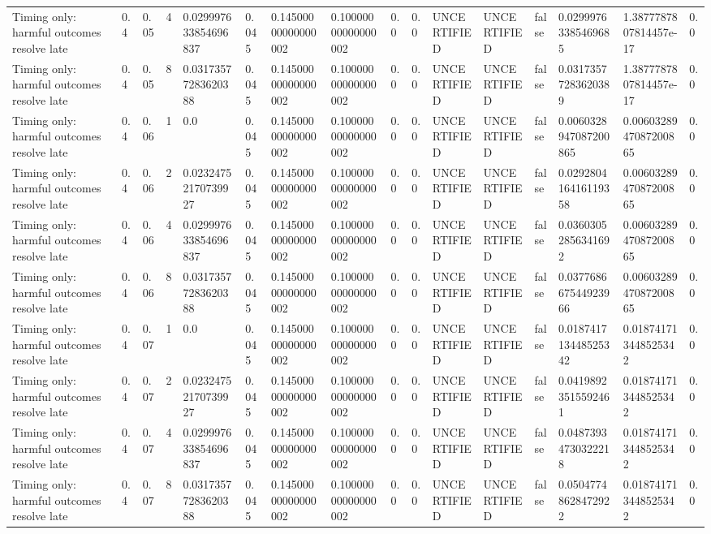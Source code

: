 \begin{tabular}{llllllllllllllll}
Timing only: harmful outcomes resolve late & 0.4 & 0.05 & 4 & 0.029997633854696837 & 0.045 & 0.14500000000000002 & 0.10000000000000002 & 0.0 & 0.0 & UNCERTIFIED & UNCERTIFIED & false & 0.02999763385469685 & 1.3877787807814457e-17 & 0.0 \\
Timing only: harmful outcomes resolve late & 0.4 & 0.05 & 8 & 0.03173577283620388 & 0.045 & 0.14500000000000002 & 0.10000000000000002 & 0.0 & 0.0 & UNCERTIFIED & UNCERTIFIED & false & 0.03173577283620389 & 1.3877787807814457e-17 & 0.0 \\
Timing only: harmful outcomes resolve late & 0.4 & 0.06 & 1 & 0.0 & 0.045 & 0.14500000000000002 & 0.10000000000000002 & 0.0 & 0.0 & UNCERTIFIED & UNCERTIFIED & false & 0.0060328947087200865 & 0.0060328947087200865 & 0.0 \\
Timing only: harmful outcomes resolve late & 0.4 & 0.06 & 2 & 0.02324752170739927 & 0.045 & 0.14500000000000002 & 0.10000000000000002 & 0.0 & 0.0 & UNCERTIFIED & UNCERTIFIED & false & 0.029280416416119358 & 0.0060328947087200865 & 0.0 \\
Timing only: harmful outcomes resolve late & 0.4 & 0.06 & 4 & 0.029997633854696837 & 0.045 & 0.14500000000000002 & 0.10000000000000002 & 0.0 & 0.0 & UNCERTIFIED & UNCERTIFIED & false & 0.03603052856341692 & 0.0060328947087200865 & 0.0 \\
Timing only: harmful outcomes resolve late & 0.4 & 0.06 & 8 & 0.03173577283620388 & 0.045 & 0.14500000000000002 & 0.10000000000000002 & 0.0 & 0.0 & UNCERTIFIED & UNCERTIFIED & false & 0.037768667544923966 & 0.0060328947087200865 & 0.0 \\
Timing only: harmful outcomes resolve late & 0.4 & 0.07 & 1 & 0.0 & 0.045 & 0.14500000000000002 & 0.10000000000000002 & 0.0 & 0.0 & UNCERTIFIED & UNCERTIFIED & false & 0.018741713448525342 & 0.018741713448525342 & 0.0 \\
Timing only: harmful outcomes resolve late & 0.4 & 0.07 & 2 & 0.02324752170739927 & 0.045 & 0.14500000000000002 & 0.10000000000000002 & 0.0 & 0.0 & UNCERTIFIED & UNCERTIFIED & false & 0.04198923515592461 & 0.018741713448525342 & 0.0 \\
Timing only: harmful outcomes resolve late & 0.4 & 0.07 & 4 & 0.029997633854696837 & 0.045 & 0.14500000000000002 & 0.10000000000000002 & 0.0 & 0.0 & UNCERTIFIED & UNCERTIFIED & false & 0.04873934730322218 & 0.018741713448525342 & 0.0 \\
Timing only: harmful outcomes resolve late & 0.4 & 0.07 & 8 & 0.03173577283620388 & 0.045 & 0.14500000000000002 & 0.10000000000000002 & 0.0 & 0.0 & UNCERTIFIED & UNCERTIFIED & false & 0.05047748628472922 & 0.018741713448525342 & 0.0 \\

\end{tabular}
